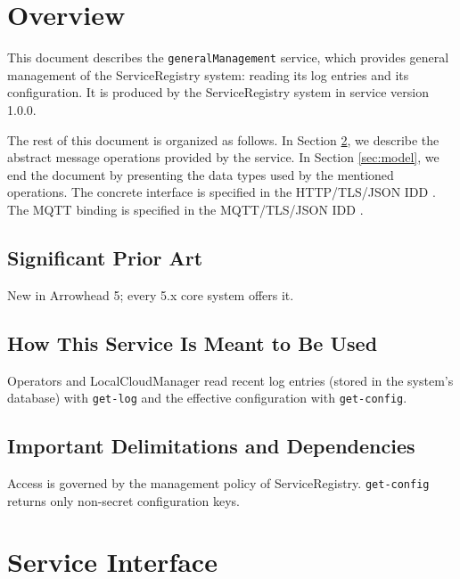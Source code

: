 \documentclass[a4paper]{arrowhead}
\begin{document}
\section{Overview}
\label{sec:overview}

This document describes the \texttt{generalManagement} service, which provides general management of the ServiceRegistry system: reading its log entries and its configuration.
It is produced by the ServiceRegistry system \cite{sr-sysd} in service version 1.0.0.

The rest of this document is organized as follows.
In Section \ref{sec:operations}, we describe the abstract message operations provided by the service.
In Section \ref{sec:model}, we end the document by presenting the data types used by the mentioned operations.
The concrete interface is specified in the HTTP/TLS/JSON IDD \cite{sr-generalManagement-http-idd}. The MQTT binding is specified in the MQTT/TLS/JSON IDD \cite{sr-generalManagement-mqtt-idd}.

\subsection{Significant Prior Art}

New in Arrowhead 5; every 5.x core system offers it.

\subsection{How This Service Is Meant to Be Used}

Operators and LocalCloudManager read recent log entries (stored in the system's database) with \texttt{get-\allowbreak{}log} and the effective configuration with \texttt{get-\allowbreak{}config}.

\subsection{Important Delimitations and Dependencies}
\label{sec:delimitations}

Access is governed by the management policy of ServiceRegistry. \texttt{get-\allowbreak{}config} returns only non-secret configuration keys.

\newpage

\section{Service Interface}
\label{sec:operations}
\end{document}
